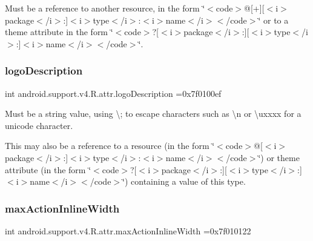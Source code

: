 Must be a reference to another resource, in the form \char`\"{}$<$code$>$@\mbox{[}+\mbox{]}\mbox{[}$<$i$>$package$<$/i$>$\+:\mbox{]}$<$i$>$type$<$/i$>$\+:$<$i$>$name$<$/i$>$$<$/code$>$\char`\"{} or to a theme attribute in the form \char`\"{}$<$code$>$?\mbox{[}$<$i$>$package$<$/i$>$\+:\mbox{]}\mbox{[}$<$i$>$type$<$/i$>$\+:\mbox{]}$<$i$>$name$<$/i$>$$<$/code$>$\char`\"{}. \mbox{\label{classandroid_1_1support_1_1v4_1_1R_1_1attr_ae318038205e8027efc855eeed3816ce1}} 
\subsubsection{\texorpdfstring{logo\+Description}{logoDescription}}
{\footnotesize\ttfamily int android.\+support.\+v4.\+R.\+attr.\+logo\+Description =0x7f0100ef\hspace{0.3cm}{\ttfamily [static]}}

Must be a string value, using \textquotesingle{}\textbackslash{};\textquotesingle{} to escape characters such as \textquotesingle{}\textbackslash{}n\textquotesingle{} or \textquotesingle{}\textbackslash{}uxxxx\textquotesingle{} for a unicode character. 

This may also be a reference to a resource (in the form \char`\"{}$<$code$>$@\mbox{[}$<$i$>$package$<$/i$>$\+:\mbox{]}$<$i$>$type$<$/i$>$\+:$<$i$>$name$<$/i$>$$<$/code$>$\char`\"{}) or theme attribute (in the form \char`\"{}$<$code$>$?\mbox{[}$<$i$>$package$<$/i$>$\+:\mbox{]}\mbox{[}$<$i$>$type$<$/i$>$\+:\mbox{]}$<$i$>$name$<$/i$>$$<$/code$>$\char`\"{}) containing a value of this type. \mbox{\label{classandroid_1_1support_1_1v4_1_1R_1_1attr_abbf94baaafc982699ebdb3912a8c0a65}} 
\subsubsection{\texorpdfstring{max\+Action\+Inline\+Width}{maxActionInlineWidth}}
{\footnotesize\ttfamily int android.\+support.\+v4.\+R.\+attr.\+max\+Action\+Inline\+Width =0x7f010122\hspace{0.3cm}{\ttfamily [static]}}

